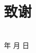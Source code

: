 \chapter{致\HDUspace{}谢}



\vspace{1cm}
\hfill
\begin{minipage}{14em}
    \makeatletter
    \begin{flushright}
        \HDU@author\\
        \HDU@defenceyear 年 \HDU@defencemonth 月 \HDU@defenceday 日
    \end{flushright}
    \makeatother
\end{minipage}
